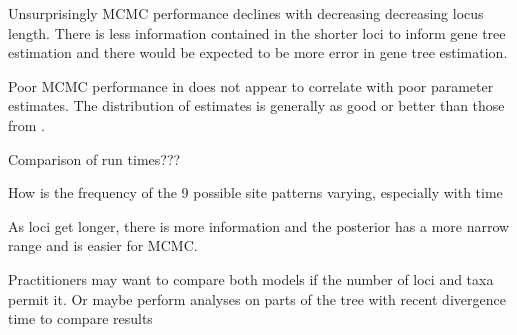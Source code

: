 Unsurprisingly MCMC performance declines with decreasing decreasing locus length.
There is less information contained in the shorter loci to inform gene tree estimation 
and there would be expected to be more error in gene tree estimation.

Poor MCMC performance in \beast does not appear to correlate with poor parameter 
estimates. The distribution of estimates is generally as good or better than those 
from \ecoevolity. 

Comparison of run times???

How is the frequency of the 9 possible site patterns varying, especially with time

As loci get longer, there is more information and the posterior has a more 
narrow range and is easier for MCMC.

Practitioners may want to compare both models if the number of loci and taxa
permit it. Or maybe perform analyses on parts of the tree with recent divergence
time to compare results 
